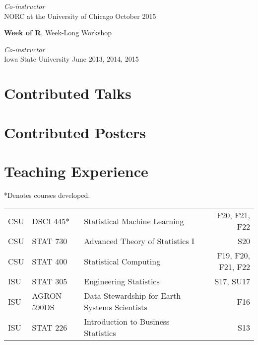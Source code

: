 \documentclass[margin,line]{res}
\begin{document}
\begin{resume}
\vspace{-.4cm}
{\em Co-instructor} \hfill \\

\vspace{-.7cm}
NORC at the University of Chicago \hfill October 2015


{\bf Week of R}, Week-Long Workshop

\vspace{-.4cm}
{\em Co-instructor} \hfill \\

\vspace{-.7cm}
Iowa State University \hfill June 2013, 2014, 2015



\section{\sc Contributed Talks}
\printbibliography[keyword=talk-contributed, heading=none, resetnumbers=true]

\section{\sc Contributed Posters}
\printbibliography[keyword=poster, heading=none, resetnumbers=true]

\section{\sc Teaching Experience}
*Denotes courses developed.\\

\vspace{-.4cm}

\begin{table}[H]
\begin{tabular}{l l l r}
CSU & DSCI 445* & Statistical Machine Learning & F20, F21, F22 \\
CSU & STAT 730 & Advanced Theory of Statistics I & S20 \\
CSU & STAT 400 & Statistical Computing & F19, F20, F21, F22 \\
ISU & STAT 305 & Engineering Statistics & S17, SU17 \\
ISU & AGRON 590DS & Data Stewardship for Earth Systems Scientists & F16 \\
ISU & STAT 226 & Introduction to Business Statistics & S13 \\
\end{tabular}
\end{table}


\end{resume}
\end{document}
